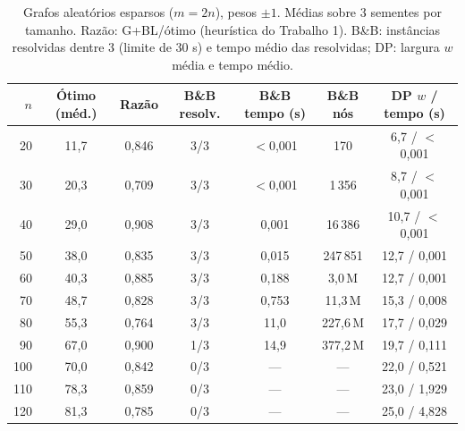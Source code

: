 \begin{table}[ht]\centering\small
\caption{Grafos aleat\'orios esparsos ($m=2n$), pesos $\pm1$. M\'edias sobre 3 sementes por tamanho. Raz\~ao: G+BL/\'otimo (heur\'istica do Trabalho 1). B\&B: inst\^ancias resolvidas dentre 3 (limite de 30 s) e tempo m\'edio das resolvidas; DP: largura $w$ m\'edia e tempo m\'edio.}\label{tab:pm1}
\begin{tabular}{rcccccc}\hline
$n$ & \'Otimo (m\'ed.) & Raz\~ao & B\&B resolv. & B\&B tempo (s) & B\&B n\'os & DP $w$ / tempo (s) \\\hline
20 & 11{,}7 & 0{,}846 & 3/3 & $<$0{,}001 & 170 & 6{,}7 / $<$0{,}001 \\
30 & 20{,}3 & 0{,}709 & 3/3 & $<$0{,}001 & 1\,356 & 8{,}7 / $<$0{,}001 \\
40 & 29{,}0 & 0{,}908 & 3/3 & 0{,}001 & 16\,386 & 10{,}7 / $<$0{,}001 \\
50 & 38{,}0 & 0{,}835 & 3/3 & 0{,}015 & 247\,851 & 12{,}7 / 0{,}001 \\
60 & 40{,}3 & 0{,}885 & 3/3 & 0{,}188 & 3{,}0\,M & 12{,}7 / 0{,}001 \\
70 & 48{,}7 & 0{,}828 & 3/3 & 0{,}753 & 11{,}3\,M & 15{,}3 / 0{,}008 \\
80 & 55{,}3 & 0{,}764 & 3/3 & 11{,}0 & 227{,}6\,M & 17{,}7 / 0{,}029 \\
90 & 67{,}0 & 0{,}900 & 1/3 & 14{,}9 & 377{,}2\,M & 19{,}7 / 0{,}111 \\
100 & 70{,}0 & 0{,}842 & 0/3 & --- & --- & 22{,}0 / 0{,}521 \\
110 & 78{,}3 & 0{,}859 & 0/3 & --- & --- & 23{,}0 / 1{,}929 \\
120 & 81{,}3 & 0{,}785 & 0/3 & --- & --- & 25{,}0 / 4{,}828 \\
\hline\end{tabular}\end{table}

